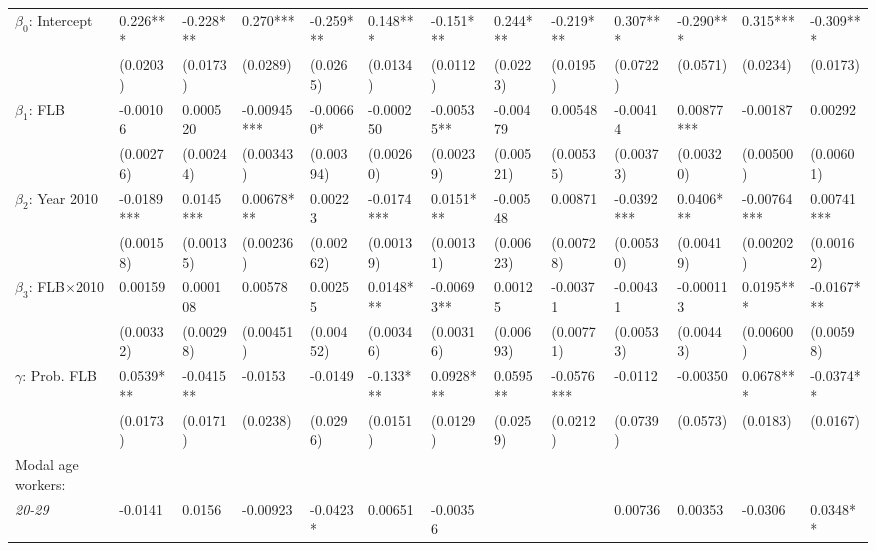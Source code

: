 \documentclass[12pt]{article}
\begin{document}
\begin{sidewaystable}[htb]
{\begin{threeparttable}
\begin{tabular}{l*{12}{l}}
\midrule
$\beta_0$: Intercept             &       0.226***    & -0.228***   & 0.270***     & -0.259***  & 0.148***   & -0.151***   & 0.244***    & -0.219***  & 0.307***   & -0.290***  & 0.315***     & -0.309***  \\
                                &       (0.0203)    & (0.0173)    & (0.0289)     & (0.0265)   & (0.0134)   & (0.0112)    & (0.0223)    & (0.0195)   & (0.0722)   & (0.0571)   & (0.0234)     & (0.0173)   \\[1ex]
$\beta_1$: FLB                  &       -0.00106    & 0.000520    & -0.00945***  & -0.00660*  & -0.000250  & -0.00535**  & -0.00479    & 0.00548    & -0.00414   & 0.00877*** & -0.00187     & 0.00292    \\
                                &       (0.00276)   & (0.00244)   & (0.00343)    & (0.00394)  & (0.00260)  & (0.00239)   & (0.00521)   & (0.00535)  & (0.00373)  & (0.00320)  & (0.00500)    & (0.00601)  \\[1ex]
$\beta_2$: Year 2010            &       -0.0189***  & 0.0145***   & 0.00678***   & 0.00223    & -0.0174*** & 0.0151***   & -0.00548    & 0.00871    & -0.0392*** & 0.0406***  & -0.00764***  & 0.00741*** \\
                                &       (0.00158)   & (0.00135)   & (0.00236)    & (0.00262)  & (0.00139)  & (0.00131)   & (0.00623)   & (0.00728)  & (0.00530)  & (0.00419)  & (0.00202)    & (0.00162)  \\[1ex]
$\beta_3$: FLB$\times$2010      &       0.00159     & 0.000108    & 0.00578      & 0.00255    & 0.0148***  & -0.00693**  & 0.00125     & -0.00371   & -0.00431   & -0.000113  & 0.0195***    & -0.0167*** \\
                                &       (0.00332)   & (0.00298)   & (0.00451)    & (0.00452)  & (0.00346)  & (0.00316)   & (0.00693)   & (0.00771)  & (0.00533)  & (0.00443)  & (0.00600)    & (0.00598)  \\[1ex]
$\gamma$: Prob. FLB              &       0.0539***   & -0.0415**   & -0.0153      & -0.0149    & -0.133***  & 0.0928***   & 0.0595**    & -0.0576*** & -0.0112    & -0.00350   & 0.0678***    & -0.0374**  \\
                                &       (0.0173)    & (0.0171)    & (0.0238)     & (0.0296)   & (0.0151)   & (0.0129)    & (0.0259)    & (0.0212)   & (0.0739)   & (0.0573)   & (0.0183)     & (0.0167)   \\[1ex]
\cmidrule(lr){1-13}
Modal age workers:             \\[1ex]
\quad \textit{20-29}            &       -0.0141     & 0.0156      & -0.00923     & -0.0423*   & 0.00651    & -0.00356    &             &            & 0.00736    & 0.00353    & -0.0306      & 0.0348**   \\

\end{tabular}
\end{threeparttable}}
\end{sidewaystable}
\end{document}
